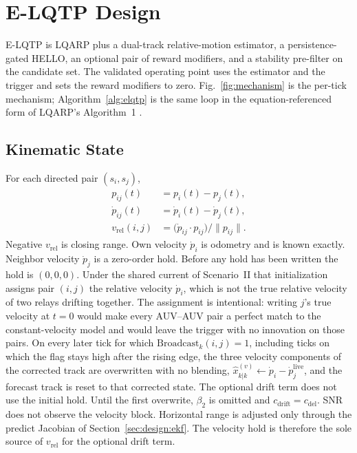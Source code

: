 \section{E-LQTP Design}
\label{sec:design}

E-LQTP is LQARP plus a dual-track relative-motion estimator, a
persistence-gated HELLO, an optional pair of reward modifiers, and a
stability pre-filter on the candidate set.
The validated operating point uses the estimator and the trigger and
sets the reward modifiers to zero.
Fig.~\ref{fig:mechanism} is the per-tick mechanism;
Algorithm~\ref{alg:elqtp} is the same loop in the equation-referenced
form of LQARP's Algorithm~1 \cite{liu2026lqarp}.


\subsection{Kinematic State}
\label{sec:design:kin}
For each directed pair $(s_i,s_j)$,
\begin{align}
\label{eq:rel}
p_{ij}(t)&=p_i(t)-p_j(t),\nonumber\\
\dot{p}_{ij}(t)&=\dot{p}_i(t)-\dot{p}_j(t),\nonumber\\
v_{\mathrm{rel}}(i,j)
&= \bigl(\dot{p}_{ij}\cdot p_{ij}\bigr)/\|p_{ij}\|.
\end{align}
Negative $v_{\mathrm{rel}}$ is closing range.
Own velocity $\dot{p}_i$ is odometry and is known exactly.
Neighbor velocity $\dot{p}_j$ is a zero-order hold.
Before any hold has been written the hold is $(0,0,0)$.
Under the shared current of Scenario~II that initialization assigns
pair $(i,j)$ the relative velocity $\dot{p}_i$, which is not the
true relative velocity of two relays drifting together.
The assignment is intentional: writing $j$'s true velocity at
$t=0$ would make every AUV--AUV pair a perfect match to the
constant-velocity model and would leave the trigger with no
innovation on those pairs.
On every later tick for which $\mathrm{Broadcast}_k(i,j)=1$,
including ticks on which the flag stays high after the rising edge,
the three velocity components of the corrected track are overwritten
with no blending,
$\hat{x}_{k|k}^{(v)}\leftarrow\dot{p}_i-\dot{p}_j^{\mathrm{live}}$,
and the forecast track is reset to that corrected state.
The optional drift term does not use the initial hold.
Until the first overwrite, $\beta_2$ is omitted and
$c_{\mathrm{drift}}=c_{\mathrm{del}}$.
SNR does not observe the velocity block.
Horizontal range is adjusted only through the predict Jacobian of
Section~\ref{sec:design:ekf}.
The velocity hold is therefore the sole source of $v_{\mathrm{rel}}$
for the optional drift term.

